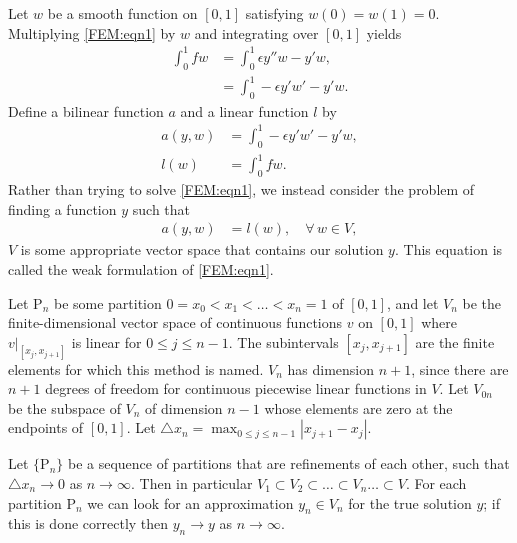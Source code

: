 Let $w$ be a smooth function on $[0,1]$ satisfying
$w(0) = w(1) = 0$. Multiplying \eqref{FEM:eqn1} by $w$ and integrating over $[0,1]$ yields
\begin{align*}
	\int_0^1 f w &= \int_0^1 \epsilon y''w - y'w, \\
	&= \int_0^1 -\epsilon y'w' - y'w.
\end{align*}
Define a bilinear function $a$ and a linear function $l$ by 
\begin{align*}
a(y,w) &= \int_0^1 -\epsilon y'w' - y'w,\\ 
l(w) &= \int_0^1 f w.
\end{align*}
Rather than trying to solve \eqref{FEM:eqn1}, we instead consider the problem of finding a function $y$ such that 
\begin{align}
	a(y,w) &= l(w), \quad \forall \, w \in V,
	\label{FEM:integral_form}
\end{align}
$V$ is some appropriate vector space that contains our solution $y$. This equation 
is called the weak formulation of \eqref{FEM:eqn1}.




Let $\mathrm{P}_n$ be some partition $0 = x_0 < x_1< \ldots < x_{n} = 1$ of $[0,1]$, and let $V_n$ be the finite-dimensional vector space of continuous functions $v$ on $[0,1]$ where $v|_{[{x_j,x_{j+1}}]}$ is linear for $0 \leq j \leq n-1$. The subintervals $[{x_j,x_{j+1}}]$ are the finite elements for which this method is named.  $V_n$ has dimension $n+1$, since there are $n+1$ degrees of freedom for continuous piecewise linear functions in $V$. Let $V_{0n}$ be the subspace of $V_n$ of dimension $n-1$ whose elements are zero at the endpoints of $[0,1]$. 
Let $\triangle x_n = \max_{0 \leq j \leq n-1}|x_{j+1} - x_j|$. 

Let $\{\mathrm{P}_n\}$ be a sequence of partitions that are refinements of each other, such that $\triangle x_n \to 0$ as $n \to \infty$. Then in particular $V_1 \subset V_2 \subset \ldots \subset V_n \ldots \subset V$.  For each partition $\mathrm{P}_n$ we can look for an approximation $y_n \in V_n$ for the true solution $y$; if this is done  correctly then $y_n \to y$ as $n \to \infty$. 

